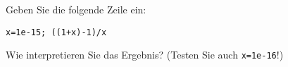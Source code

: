 \begin{aufg}[0]
Geben Sie die folgende Zeile ein: 
\begin{lstlisting}
x=1e-15; ((1+x)-1)/x
\end{lstlisting} 
Wie interpretieren Sie das Ergebnis? 
(Testen Sie auch \lstinline!x=1e-16!!)
\end{aufg}